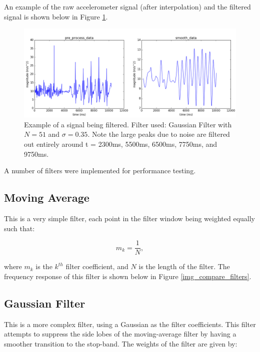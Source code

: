             An example of the raw accelerometer signal (after interpolation) and the filtered signal is shown below in Figure \ref{img_filtered_signal}.

            \begin{figure}[h]
                \includegraphics[width=\textwidth]{Images/filtered_signal.png}
                \centering
                \caption{Example of a signal being filtered. Filter used: Gaussian Filter with $N=51$ and $\sigma=0.35$. Note the large peaks due to noise are filtered out entirely around t = 2300ms, 5500ms, 6500ms, 7750ms, and 9750ms.}
                \label{img_filtered_signal}
            \end{figure}

            A number of filters were implemented for performance testing.

            \subsection{Moving Average}

                This is a very simple filter, each point in the filter window being weighted equally such that:

                \begin{equation}
                    m_k = \frac{1}{N},
                \end{equation}

                where $m_k$ is the $k^{th}$ filter coefficient, and $N$ is the length of the filter. The frequency response of this filter is shown below in Figure \ref{img_compare_filters}.

            \subsection{Gaussian Filter}

                This is a more complex filter, using a Gaussian as the filter coefficients. This filter attempts to suppress the side lobes of the moving-average filter by having a smoother transition to the stop-band. The weights of the filter are given by:

